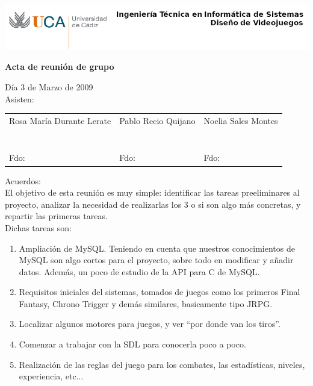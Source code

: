 \documentclass[a4paper,10pt]{article}
\begin{document}
\includegraphics[scale=0.6]{../uca.png}

\begin{center}
  \noindent \huge\textbf{ Acta de reunión de grupo}\\
\end{center}

\noindent Día 3 de Marzo de 2009\\

\noindent Asisten:

\begin{center}
\begin{tabular}{|m{5.2cm}|m{5.2cm}|m{5.2cm}|}
  \hline
  Rosa María Durante Lerate & Pablo Recio Quijano & Noelia Sales Montes\\
  & & \\
  & & \\
  & & \\
  & & \\
  & & \\
  & & \\
  & & \\
  Fdo: & Fdo: & Fdo: \\
  \hline
\end{tabular}
\end{center}

\noindent Acuerdos:\\

\noindent El objetivo de esta reunión es muy simple: identificar las
tareas preeliminares al proyecto, analizar la necesidad de realizarlas
los 3 o si son algo más concretas, y repartir las primeras tareas.\\

\noindent Dichas tareas son:

\begin{enumerate}
\item Ampliación de MySQL. Teniendo en cuenta que nuestros
  conocimientos de MySQL son algo cortos para el proyecto, sobre todo
  en modificar y añadir datos. Además, un poco de estudio de la API
  para C de MySQL.
\item Requisitos iniciales del sistemas, tomados de juegos como los
  primeros Final Fantasy, Chrono Trigger y demás similares,
  basicamente tipo JRPG.
\item Localizar algunos motores para juegos, y ver ``por donde van los
  tiros''.
\item Comenzar a trabajar con la SDL para conocerla poco a poco.
\item Realización de las reglas del juego para los combates, las
  estadísticas, niveles, experiencia, etc...
\end{enumerate}
\end{document}
